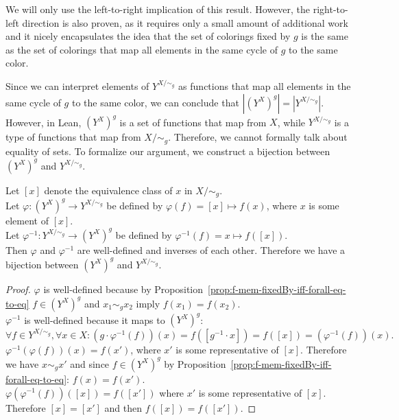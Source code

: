 We will only use the left-to-right implication of this result. However, the right-to-left direction is also proven, as it requires only a small amount of additional work and it nicely encapsulates the idea that the set of colorings fixed by $g$ is the same as the set of colorings that map all elements in the same cycle of $g$ to the same color.

Since we can interpret elements of $Y^{X/\sim_g}$ as functions that map all elements in the same cycle of $g$ to the same color, we can conclude that $|(Y^X)^g| = |Y^{X/\sim_g}|$. However, in Lean, $(Y^X)^g$ is a set of functions that map from $X$, while $Y^{X/\sim_g}$ is a type of functions that map from $X/\sim_g$. Therefore, we cannot formally talk about equality of sets. To formalize our argument, we construct a bijection between $(Y^X)^g$ and $Y^{X/\sim_g}$.

\begin{proposition}
  \label{prop:equiv_of_fixedBy_coloring_of_cycle_coloring}
  \leanok
  Let $[x]$ denote the equivalence class of $x$ in $X/\sim_g$.\\
  Let $\varphi : (Y^X)^g \to Y^{X/\sim_g}$ be defined by $\varphi(f) = [x] \mapsto f(x)$, where $x$ is some element of $[x]$.\\
  Let $\varphi^{-1} : Y^{X/\sim_g} \to (Y^X)^g$ be defined by $\varphi^{-1}(f) = x \mapsto f([x])$.\\
  Then $\varphi$ and $\varphi^{-1}$ are well-defined and inverses of each other. Therefore we have a bijection between $(Y^X)^g$ and $Y^{X/\sim_g}$.
\end{proposition}

\begin{proof}
  \leanok
  $\varphi$ is well-defined because by Proposition~\ref{prop:f-mem-fixedBy-iff-forall-eq-to-eq} $f \in (Y^X)^g$ and $x_1 \sim_g x_2$ imply $f(x_1) = f(x_2)$.\\
  $\varphi^{-1}$ is well-defined because it maps to $(Y^X)^g$:
  \begin{equation*}
    \forall f \in Y^{X/\sim_g}, \forall x \in X: (g \cdot \varphi^{-1}(f))(x) = f([g^{-1} \cdot x]) = f([x]) = (\varphi^{-1}(f))(x).
  \end{equation*}
  $\varphi^{-1}(\varphi(f))(x) = f(x')$, where $x'$ is some representative of $[x]$. Therefore we have $x \sim_g x'$ and since $f \in (Y^X)^g$ by Proposition~\ref{prop:f-mem-fixedBy-iff-forall-eq-to-eq}: $f(x) = f(x')$.\\
  $\varphi(\varphi^{-1}(f))([x]) = f([x'])$ where $x'$ is some representative of $[x]$. Therefore $[x] = [x']$ and then $f([x]) = f([x'])$.
\end{proof}

